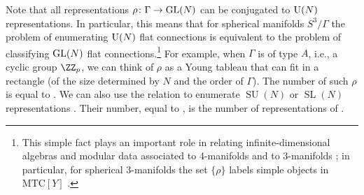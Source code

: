 \documentclass[10pt,a4paper]{amsart}
\begin{document}
Note that all representations $\rho\colon \Gamma \to {\rm GL}(N)$ can be conjugated to ${\rm U}(N)$ representations. In particular, this means that for spherical manifolds $S^3 / \Gamma$ the problem of enumerating ${\rm U}(N)$ flat connections is equivalent to the problem of classifying ${\rm GL}(N)$ flat connections.\footnote{This simple fact plays an important role in relating infinite-dimensional algebras and modular data associated to 4-manifolds and to 3-manifolds \cite{FG18}; in particular, for spherical 3-manifolds the set $\{ \rho \}$ labels simple objects in $\text{MTC} [Y]$ \cite{CCFGH18}.} For example, when $\Gamma$ is of type $A$, i.e., a cyclic group $\ZZ_p$, we can think of $\rho$ as a Young tableau that can fit in a rectangle (of the size determined by $N$ and the order of $\Gamma$). The number of such $\rho$ is equal to . We can also use the relation  to enumerate $\operatorname{SU}(N)$ or $\operatorname{SL}(N)$ representations
.
Their number, equal to , is the number of representations of .
\end{document}
